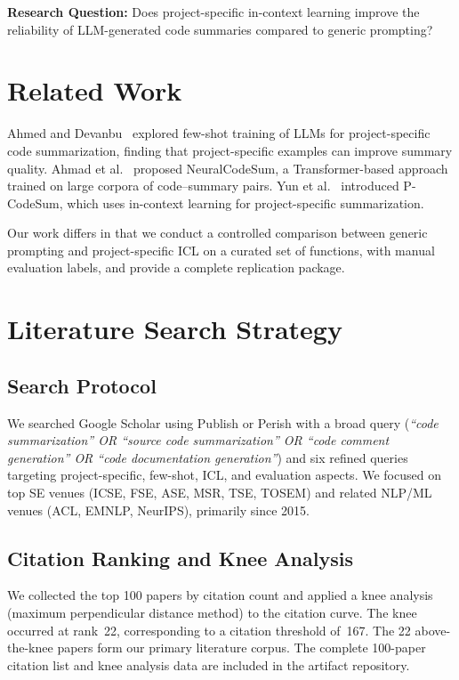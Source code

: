 \documentclass[conference]{IEEEtran}
\begin{document}
\textbf{Research Question:} Does project-specific in-context learning improve
the reliability of LLM-generated code summaries compared to generic prompting?

\section{Related Work}
\label{sec:related-work}

Ahmed and Devanbu~\cite{ahmed2022fewshot} explored few-shot training of LLMs
for project-specific code summarization, finding that project-specific examples
can improve summary quality. Ahmad et al.~\cite{ahmad2020neuralcodesum}
proposed NeuralCodeSum, a Transformer-based approach trained on large corpora
of code--summary pairs. Yun et al.~\cite{yun2024pcodesum} introduced
P-CodeSum, which uses in-context learning for project-specific summarization.

Our work differs in that we conduct a controlled comparison between generic
prompting and project-specific ICL on a curated set of functions, with manual
evaluation labels, and provide a complete replication package.

\section{Literature Search Strategy}
\label{sec:literature-search}

\subsection{Search Protocol}
We searched Google Scholar using Publish or Perish with a broad query
(\textit{``code summarization'' OR ``source code summarization'' OR ``code
comment generation'' OR ``code documentation generation''}) and six refined
queries targeting project-specific, few-shot, ICL, and evaluation aspects.
We focused on top SE venues (ICSE, FSE, ASE, MSR, TSE, TOSEM) and related
NLP/ML venues (ACL, EMNLP, NeurIPS), primarily since 2015.

\subsection{Citation Ranking and Knee Analysis}
We collected the top 100 papers by citation count and applied a knee analysis
(maximum perpendicular distance method) to the citation curve. The knee
occurred at rank~22, corresponding to a citation threshold of~167. The 22
above-the-knee papers form our primary literature corpus.
The complete 100-paper citation list and knee analysis data are included in
the artifact repository.
\end{document}
